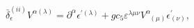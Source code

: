 \begin{equation}
\bar{\delta}_{\epsilon }^{(ii)}V^{\alpha (\lambda )}=\partial ^{\alpha
}\epsilon ^{\prime (\lambda )}+gc_{5}\varepsilon ^{\lambda \mu \nu
}V_{\;\;(\mu )}^{\alpha }\epsilon _{(\nu )}^{\prime },  \label{bf99}
\end{equation}

